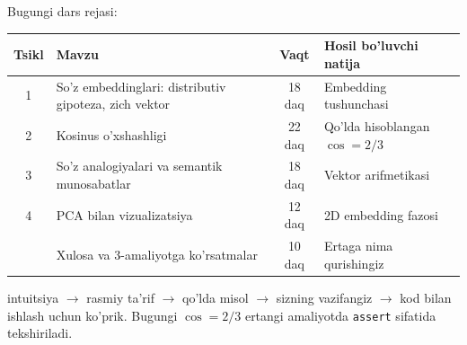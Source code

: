 \documentclass[aspectratio=169,11pt]{beamer}
\begin{document}
\begin{frame}{Bugungi dars rejasi:}
  \begin{center}
  \small
  \begin{tabular}{c p{4.6cm} c p{3.4cm}}
    \toprule
    \textbf{Tsikl}& \textbf{Mavzu} & \textbf{Vaqt} & \textbf{Hosil bo'luvchi natija}\\
    \midrule
    1 & So'z embeddinglari: distributiv gipoteza, zich vektor & 18 daq & Embedding tushunchasi \\
    2 & Kosinus o'xshashligi & 22 daq & Qo'lda hisoblangan $\cos = 2/3$ \\
    3 & So'z analogiyalari va semantik munosabatlar & 18 daq & Vektor arifmetikasi \\
    4 & PCA bilan vizualizatsiya & 12 daq & 2D embedding fazosi \\
    \midrule
      & Xulosa va 3-amaliyotga ko'rsatmalar & 10 daq & Ertaga nima qurishingiz \\
    \bottomrule
  \end{tabular}
  \end{center}
  \vspace{4pt}
  \begin{tcolorbox}[warnbox,title=Har bir tsikl qanday qurilgan]
    \footnotesize\sloppy
    intuitsiya $\to$ rasmiy ta'rif $\to$ qo'lda misol $\to$ sizning
    vazifangiz $\to$ kod bilan ishlash uchun ko'prik. Bugungi
    $\cos = 2/3$ ertangi amaliyotda \texttt{assert} sifatida tekshiriladi.
  \end{tcolorbox}
\end{frame}
\end{document}
